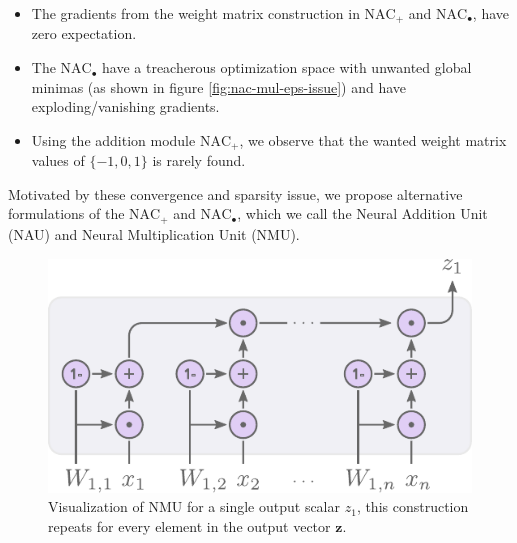 \begin{itemize}
\item The gradients from the weight matrix construction in $\text{NAC}_{+}$ and $\text{NAC}_{\bullet}$, have zero expectation.

\item The $\text{NAC}_{\bullet}$ have a treacherous optimization space with unwanted global minimas (as shown in figure \ref{fig:nac-mul-eps-issue}) and have exploding/vanishing gradients.

\item Using the addition module $\text{NAC}_{+}$, we observe that the wanted weight matrix values of $\{-1, 0, 1\}$ is rarely found.
\end{itemize}

Motivated by these convergence and sparsity issue, we propose alternative formulations of the $\text{NAC}_{+}$ and $\text{NAC}_{\bullet}$, which we call the Neural Addition Unit (NAU) and Neural Multiplication Unit (NMU).

\begin{figure}[H]
\centering
\includegraphics[scale=0.8]{graphics/nmu.pdf}
\caption{Visualization of NMU for a single output scalar $z_1$, this construction repeats for every element in the output vector $\mathbf{z}$.}
\end{figure}


